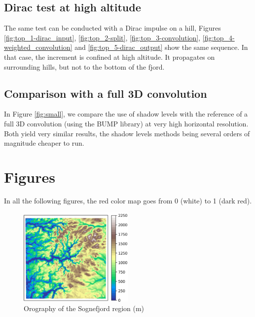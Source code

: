 \documentclass[12pt]{scrartcl}
\begin{document}
\subsection{Dirac test at high altitude}
The same test can be conducted with a Dirac impulse on a hill, Figures \ref{fig:top_1-dirac_input}, \ref{fig:top_2-split}, \ref{fig:top_3-convolution}, \ref{fig:top_4-weighted_convolution} and \ref{fig:top_5-dirac_output} show the same sequence. In that case, the increment is confined at high altitude. It propagates on surrounding hills, but not to the bottom of the fjord.

\subsection{Comparison with a full 3D convolution}
In Figure \ref{fig:small}, we compare the use of shadow levels with the reference of a full 3D convolution (using the BUMP library) at very high horizontal resolution. Both yield very similar results, the shadow levels methods being several orders of magnitude cheaper to run.

\clearpage

\section*{Figures}
In all the following figures, the red color map goes from 0 (white) to 1 (dark red).

\begin{figure}[!ht]
\centering
\includegraphics[width=0.5\textwidth]{orography.jpg}
\caption{Orography of the Sognefjord region (m)} \label{fig:orography}
\end{figure}
\end{document}
